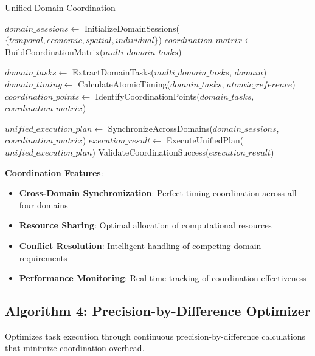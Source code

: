 \documentclass[12pt,a4paper]{article}
\begin{document}
\begin{algorithm}
\caption{Unified Domain Coordination}
\begin{algorithmic}[1]
    \State $domain\_sessions \gets$ InitializeDomainSessions($\{temporal, economic, spatial, individual\}$)
    \State $coordination\_matrix \gets$ BuildCoordinationMatrix($multi\_domain\_tasks$)
    
        \State $domain\_tasks \gets$ ExtractDomainTasks($multi\_domain\_tasks$, $domain$)
        \State $domain\_timing \gets$ CalculateAtomicTiming($domain\_tasks$, $atomic\_reference$)
        \State $coordination\_points \gets$ IdentifyCoordinationPoints($domain\_tasks$, $coordination\_matrix$)
    \EndFor
    
    \State $unified\_execution\_plan \gets$ SynchronizeAcrossDomains($domain\_sessions$, $coordination\_matrix$)
    \State $execution\_result \gets$ ExecuteUnifiedPlan($unified\_execution\_plan$)
    \State \Return ValidateCoordinationSuccess($execution\_result$)
\EndProcedure
\end{algorithmic}
\end{algorithm}

\textbf{Coordination Features}:
\begin{itemize}
\item \textbf{Cross-Domain Synchronization}: Perfect timing coordination across all four domains
\item \textbf{Resource Sharing}: Optimal allocation of computational resources
\item \textbf{Conflict Resolution}: Intelligent handling of competing domain requirements
\item \textbf{Performance Monitoring}: Real-time tracking of coordination effectiveness
\end{itemize}

\subsection{Algorithm 4: Precision-by-Difference Optimizer}

Optimizes task execution through continuous precision-by-difference calculations that minimize coordination overhead.
\end{document}
